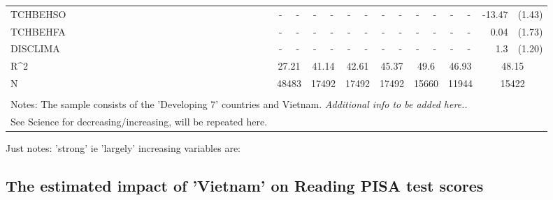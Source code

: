 \documentclass[12pt]{article}%
\begin{document}
\begin{table}[H]
\begin{tabular}{lrlrlrlrlrlrlrl}
			TCHBEHSO & \multicolumn{1}{c}{-} & \multicolumn{1}{c}{-} & \multicolumn{1}{c}{-} & \multicolumn{1}{c}{-} & \multicolumn{1}{c}{-} & \multicolumn{1}{c}{-} & \multicolumn{1}{c}{-} & \multicolumn{1}{c}{-} & \multicolumn{1}{c}{-} & \multicolumn{1}{c}{-} & \multicolumn{1}{c}{-} & \multicolumn{1}{c}{-} & -13.47 & (1.43) \\[0.2em]
			TCHBEHFA & \multicolumn{1}{c}{-} & \multicolumn{1}{c}{-} & \multicolumn{1}{c}{-} & \multicolumn{1}{c}{-} & \multicolumn{1}{c}{-} & \multicolumn{1}{c}{-} & \multicolumn{1}{c}{-} & \multicolumn{1}{c}{-} & \multicolumn{1}{c}{-} & \multicolumn{1}{c}{-} & \multicolumn{1}{c}{-} & \multicolumn{1}{c}{-} & 0.04  & (1.73) \\[0.2em]
			DISCLIMA & \multicolumn{1}{c}{-} & \multicolumn{1}{c}{-} & \multicolumn{1}{c}{-} & \multicolumn{1}{c}{-} & \multicolumn{1}{c}{-} & \multicolumn{1}{c}{-} & \multicolumn{1}{c}{-} & \multicolumn{1}{c}{-} & \multicolumn{1}{c}{-} & \multicolumn{1}{c}{-} & \multicolumn{1}{c}{-} & \multicolumn{1}{c}{-} & 1.3   & (1.20) \\[0.2em]
			
			R^{2}   & \multicolumn{2}{c}{27.21} & \multicolumn{2}{c}{41.14} & \multicolumn{2}{c}{42.61} & \multicolumn{2}{c}{45.37} & \multicolumn{2}{c}{49.6} & \multicolumn{2}{c}{46.93} & \multicolumn{2}{c}{48.15} \\
			N     & \multicolumn{2}{c}{48483} & \multicolumn{2}{c}{17492} & \multicolumn{2}{c}{17492} & \multicolumn{2}{c}{17492} & \multicolumn{2}{c}{15660} & \multicolumn{2}{c}{11944} & \multicolumn{2}{c}{15422} \\
			
			\bottomrule
			
			\\
			\multicolumn{15}{l}{Notes: The sample consists of the 'Developing 7' countries and Vietnam. \textit{Additional info to be added here..}}\\
	
	See Science for decreasing/increasing, will be repeated here.
	
		\end{tabular}%
		\label{tab:addlabel}%
	\end{table}%

Just notes: 'strong' ie 'largely' increasing variables are: 

\subsection{The estimated impact of 'Vietnam' on Reading PISA test scores}
\end{document}
